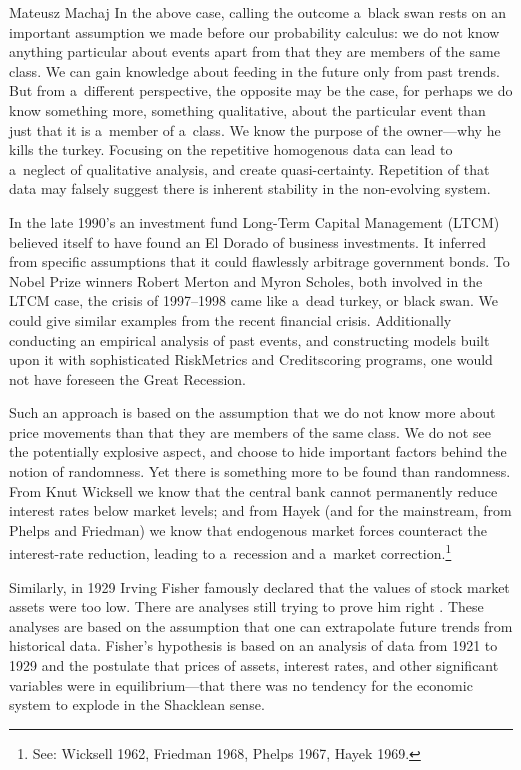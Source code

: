 \begin{artengenv}{Mateusz Machaj}
In the above case, calling the outcome a~black swan rests on an important assumption we made before our probability calculus: we do not know anything particular about events apart from that they are members of the same class. We can gain knowledge about feeding in the future only from past trends. But from a~different perspective, the opposite may be the case, for perhaps we do know something more, something qualitative, about the particular event than just that it is a~member of a~class. We know the purpose of the owner---why he kills the turkey. Focusing on the repetitive homogenous data can lead to a~neglect of qualitative analysis, and create quasi-certainty. Repetition of that data may falsely suggest there is inherent stability in the non-evolving system.



In the late 1990's an investment fund Long-Term Capital Management (LTCM) believed itself to have found an El Dorado of business investments. It inferred from specific assumptions that it could flawlessly arbitrage government bonds. To Nobel Prize winners Robert Merton and Myron Scholes, both involved in the LTCM case, the crisis of 1997–1998 came like a~dead turkey, or black swan. We could give similar examples from the recent financial crisis. Additionally conducting an empirical analysis of past events, and constructing models built upon it with sophisticated RiskMetrics and Creditscoring programs, one would not have foreseen the Great Recession.



Such an approach is based on the assumption that we do not know more about price movements than that they are members of the same class. We do not see the potentially explosive aspect, and choose to hide important factors behind the notion of randomness. Yet there is something more to be found than randomness. From Knut Wicksell we know that the central bank cannot permanently reduce interest rates below market levels; and from Hayek (and for the mainstream, from Phelps and Friedman) we know that endogenous market forces counteract the interest-rate reduction, leading to a~recession and a~market correction.\footnote{See: Wicksell 1962, Friedman 1968, Phelps 1967, Hayek 1969.}



Similarly, in 1929 Irving Fisher famously declared that the values of stock market assets were too low. There are analyses still trying to prove him right 
\parencite[see, for example,][]{mcgrattan_1929_2003}. %
 These analyses are based on the assumption that one can extrapolate future trends from historical data. Fisher's hypothesis is based on an analysis of data from 1921 to 1929 and the postulate that prices of assets, interest rates, and other significant variables were in equilibrium---that there was no tendency for the economic system to explode in the Shacklean sense.




\end{artengenv}
